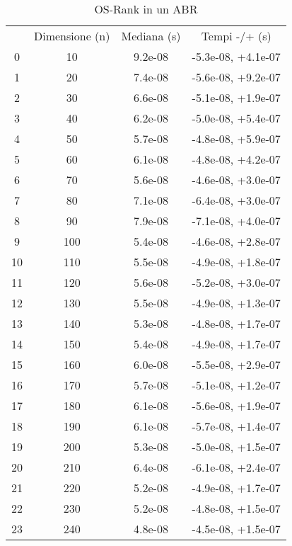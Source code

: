 \begin{table}
\centering
\caption{OS-Rank in un ABR}
\label{OS-Rank in un ABR}
\begin{adjustbox}{width=1\textwidth/2}
\begin{tabular}{|c|c|c|c|}
\hline
 & Dimensione (n) & Mediana (s) & Tempi -/+ (s) \\
0 & 10 & 9.2e-08 & -5.3e-08, +4.1e-07 \\
\cline{1-4}
1 & 20 & 7.4e-08 & -5.6e-08, +9.2e-07 \\
\cline{1-4}
2 & 30 & 6.6e-08 & -5.1e-08, +1.9e-07 \\
\cline{1-4}
3 & 40 & 6.2e-08 & -5.0e-08, +5.4e-07 \\
\cline{1-4}
4 & 50 & 5.7e-08 & -4.8e-08, +5.9e-07 \\
\cline{1-4}
5 & 60 & 6.1e-08 & -4.8e-08, +4.2e-07 \\
\cline{1-4}
6 & 70 & 5.6e-08 & -4.6e-08, +3.0e-07 \\
\cline{1-4}
7 & 80 & 7.1e-08 & -6.4e-08, +3.0e-07 \\
\cline{1-4}
8 & 90 & 7.9e-08 & -7.1e-08, +4.0e-07 \\
\cline{1-4}
9 & 100 & 5.4e-08 & -4.6e-08, +2.8e-07 \\
\cline{1-4}
10 & 110 & 5.5e-08 & -4.9e-08, +1.8e-07 \\
\cline{1-4}
11 & 120 & 5.6e-08 & -5.2e-08, +3.0e-07 \\
\cline{1-4}
12 & 130 & 5.5e-08 & -4.9e-08, +1.3e-07 \\
\cline{1-4}
13 & 140 & 5.3e-08 & -4.8e-08, +1.7e-07 \\
\cline{1-4}
14 & 150 & 5.4e-08 & -4.9e-08, +1.7e-07 \\
\cline{1-4}
15 & 160 & 6.0e-08 & -5.5e-08, +2.9e-07 \\
\cline{1-4}
16 & 170 & 5.7e-08 & -5.1e-08, +1.2e-07 \\
\cline{1-4}
17 & 180 & 6.1e-08 & -5.6e-08, +1.9e-07 \\
\cline{1-4}
18 & 190 & 6.1e-08 & -5.7e-08, +1.4e-07 \\
\cline{1-4}
19 & 200 & 5.3e-08 & -5.0e-08, +1.5e-07 \\
\cline{1-4}
20 & 210 & 6.4e-08 & -6.1e-08, +2.4e-07 \\
\cline{1-4}
21 & 220 & 5.2e-08 & -4.9e-08, +1.7e-07 \\
\cline{1-4}
22 & 230 & 5.2e-08 & -4.8e-08, +1.5e-07 \\
\cline{1-4}
23 & 240 & 4.8e-08 & -4.5e-08, +1.5e-07 \\

\end{tabular}
\end{adjustbox}
\end{table}
